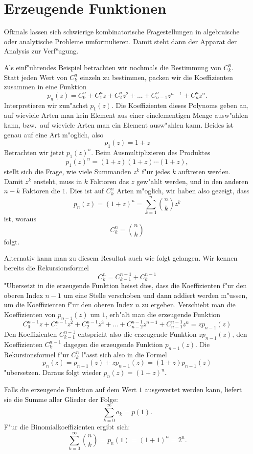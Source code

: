 \section{Erzeugende Funktionen}
Oftmals lassen sich schwierige kombinatorische Fragestellungen in
algebraische oder analytische Probleme umformulieren. Damit steht
dann der Apparat der Analysis zur Verf"ugung.

Als einf"uhrendes
Beispiel betrachten wir nochmals die Bestimmung von $C^n_k$.
Statt jeden Wert von $C^n_k$ einzeln zu bestimmen, packen wir
die Koeffizienten zusammen in eine Funktion
\[
p_n(z)=C^n_0+C^n_1z +C^n_2z^2+\dots+C^n_{n-1}z^{n-1}+C^n_nz^n.
\]
Interpretieren wir zun"achst $p_1(z)$. Die Koeffizienten dieses
Polynoms geben an, auf wieviele Arten man kein Element aus einer
einelementigen Menge ausw"ahlen kann, bzw.~auf wieviele Arten man 
ein Element ausw"ahlen kann. Beides ist genau auf eine Art m"oglich,
also
\[
p_1(z)=1+z
\]
Betrachten wir jetzt $p_1(z)^n$. Beim Ausmultiplizieren des
Produktes 
\[
p_1(z)^n= (1+z)(1+z)\cdots(1+z),
\]
stellt sich die Frage, wie viele Summanden $z^k$ f"ur jedes
$k$ auftreten werden.
Damit $z^k$ ensteht, muss in $k$ Faktoren das $z$ gew"ahlt werden,
und in den anderen $n-k$ Faktoren die $1$. Dies ist auf $C^n_k$
Arten m"oglich, wir haben also gezeigt, dass
\[
p_n(z)=(1+z)^n=\sum_{k=1}^n \binom{n}{k}z^k
\]
ist, woraus
\[
C^n_k=\binom{n}{k}
\]
folgt.

Alternativ kann man zu diesem Resultat auch wie folgt gelangen.
Wir kennen bereits die Rekursionsformel
\[
C^n_k=C^{n-1}_{k-1}+C^{n-1}_k
\]
"Ubersetzt in die erzeugende Funktion heisst dies, dass die Koeffizienten
f"ur den oberen Index $n-1$
um eine Stelle verschoben und dann addiert werden m"ussen,
um die Koeffizienten f"ur den oberen Index $n$ zu ergeben. Verschiebt
man die Koeffizienten von $p_{n-1}(z)$ um $1$,
erh"alt man die erzeugende Funktion
\[
C^{n-1}_0z
+C^{n-1}_1z^2
+C^{n-1}_2z^3
+\dots
+C^{n-1}_{n-2}z^{n-1}
+C^{n-1}_{n-1}z^n
=zp_{n-1}(z)
\]
Den Koeffizienten $C^{n-1}_{k-1}$ entspricht also die
erzeugende Funktion $zp_{n-1}(z)$,
den Koeffizienten $C^{n-1}_k$ dagegen die erzeugende Funktion $p_{n-1}(z)$.
Die Rekursionsformel f"ur $C^n_k$ l"asst sich also in die Formel
\[
p_n(z)=p_{n-1}(z)+zp_{n-1}(z)=(1+z)p_{n-1}(z)
\]
"ubersetzen. Daraus folgt wieder $p_n(z)=(1+z)^n$.

Falls die erzeugende Funktion auf dem Wert $1$ ausgewertet werden kann,
liefert sie die Summe aller Glieder der Folge:
\[
\sum_{k=0}^\infty a_k=p(1).
\]
F"ur die Binomialkoeffizienten ergibt sich:
\[
\sum_{k=0}^\infty\binom{n}{k}=p_n(1)=(1+1)^n=2^n.
\]

